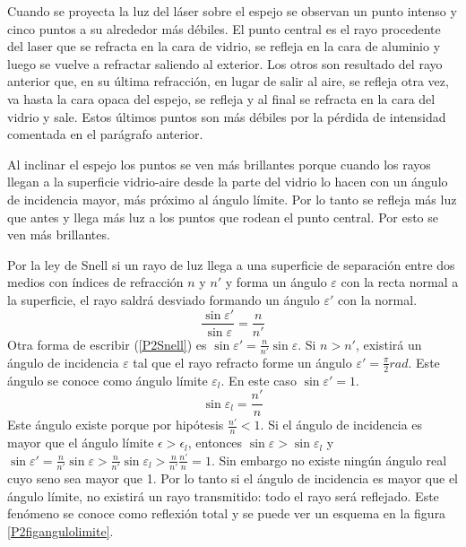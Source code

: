\documentclass[12pt]{article}
\numberwithin{table}{section}
\numberwithin{figure}{section}
\numberwithin{equation}{section}
\DeclareMathOperator{\sen}{sin}
\begin{document}
Cuando se proyecta la luz del láser sobre el espejo se observan un punto intenso y cinco puntos a su alrededor más débiles. El punto central es el rayo procedente del laser que se refracta en la cara de vidrio, se refleja en la cara de aluminio y luego se vuelve a refractar saliendo al exterior. Los otros son resultado del rayo anterior que, en su última refracción, en lugar de salir al aire, se refleja otra vez, va hasta la cara opaca del espejo, se refleja y al final se refracta en la cara del vidrio y sale. Estos últimos puntos son más débiles por la pérdida de intensidad comentada en el parágrafo anterior.

Al inclinar el espejo los puntos se ven más brillantes porque cuando los rayos llegan a la superficie vidrio-aire desde la parte del vidrio lo hacen con un ángulo de incidencia mayor, más próximo al ángulo límite. Por lo tanto se refleja más luz que antes y llega más luz a los puntos que rodean el punto central. Por esto se ven más brillantes.

Por la ley de Snell si un rayo de luz llega a una superficie de separación entre dos medios con índices de refracción $n$ y $n'$ y forma un ángulo $\varepsilon$ con la recta normal a la superficie, el rayo saldrá desviado formando un ángulo $\varepsilon'$ con la normal.
\begin{equation}\label{P2Snell}
	\frac{\sen\varepsilon'}{\sen\varepsilon}=\frac{n}{n'}
\end{equation}
Otra forma de escribir (\ref{P2Snell}) es $\sen\varepsilon'=\frac{n}{n'}\sen\varepsilon$. Si $n>n'$, existirá un ángulo de incidencia $\varepsilon$ tal que el rayo refracto forme un ángulo $\varepsilon'= {\frac{\pi}{2}}\si{rad}$. Este ángulo se conoce como ángulo límite $\varepsilon_l$. En este caso $\sen\varepsilon'=1$.
\begin{equation}\label{P2eqangulolimite}
	\sen\varepsilon_l=\frac{n'}{n}
\end{equation}
Este ángulo existe porque por hipótesis $\frac{n'}{n}<1$. Si el ángulo de incidencia es mayor que el ángulo límite $\epsilon>\epsilon_l$, entonces $\sen\varepsilon>\sen\varepsilon_l$ y $\sen\varepsilon'=\frac{n}{n'}\sen\varepsilon>\frac{n}{n'}\sen\varepsilon_l>\frac{n}{n'}\frac{n'}{n}=1$. Sin embargo no existe ningún ángulo real cuyo seno sea mayor que 1. Por lo tanto si el ángulo de incidencia es mayor que el ángulo límite, no existirá un rayo transmitido: todo el rayo será reflejado. Este fenómeno se conoce como reflexión total y se puede ver un esquema en la figura \ref{P2figangulolimite}.
\end{document}
